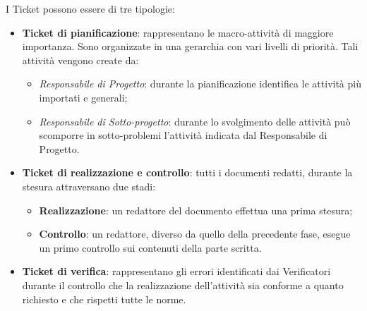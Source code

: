 I Ticket possono essere di tre tipologie:
\begin{itemize}


\item \textbf{Ticket di pianificazione}: rappresentano le macro-attività di maggiore importanza. Sono organizzate in una gerarchia con vari livelli di priorità.
 Tali attività vengono create da: 
\begin{itemize}
\item \emph{Responsabile di Progetto}: durante la pianificazione identifica le attività più importati e generali; 
\item \emph{Responsabile di Sotto-progetto}: durante lo svolgimento delle attività può scomporre in sotto-problemi l’attività indicata dal Responsabile di Progetto. 
\end{itemize}


\item \textbf{Ticket di realizzazione e controllo}: tutti i documenti redatti, durante la stesura attraversano due stadi: 
\begin{itemize}
\item \textbf{Realizzazione}: un redattore del documento effettua una prima stesura; 
\item \textbf{Controllo}: un redattore, diverso da quello della precedente fase, esegue un primo controllo sui contenuti della parte scritta. 
\end{itemize}


\item \textbf{Ticket di verifica}: rappresentano gli errori identificati dai Verificatori durante 
il controllo che la realizzazione dell'attività sia conforme a quanto richiesto e che 
rispetti tutte le norme.
\end{itemize}




